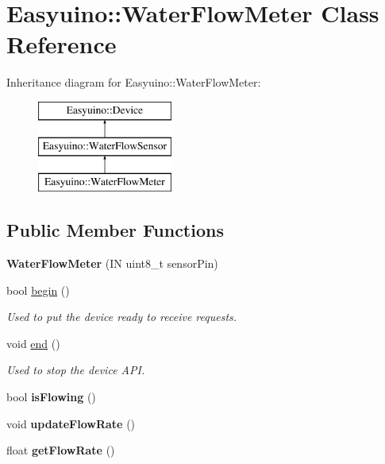 \hypertarget{class_easyuino_1_1_water_flow_meter}{}\section{Easyuino\+:\+:Water\+Flow\+Meter Class Reference}
\label{class_easyuino_1_1_water_flow_meter}
Inheritance diagram for Easyuino\+:\+:Water\+Flow\+Meter\+:\begin{figure}[H]
\begin{center}
\leavevmode
\includegraphics[height=3.000000cm]{class_easyuino_1_1_water_flow_meter}
\end{center}
\end{figure}
\subsection*{Public Member Functions}
\begin{DoxyCompactItemize}
\item 
\mbox{\label{class_easyuino_1_1_water_flow_meter_a253cbf06355c4e7dd79ef801d18c5119}} 
{\bfseries Water\+Flow\+Meter} (IN uint8\+\_\+t sensor\+Pin)
\item 
bool \hyperlink{class_easyuino_1_1_water_flow_meter_a400c25b10a7cde45c623805546d071cd}{begin} ()
\begin{DoxyCompactList}\small\item\em Used to put the device ready to receive requests. \end{DoxyCompactList}\item 
void \hyperlink{class_easyuino_1_1_water_flow_meter_a47024d4da9568e42743a875c08c33121}{end} ()
\begin{DoxyCompactList}\small\item\em Used to stop the device A\+PI. \end{DoxyCompactList}\item 
\mbox{\label{class_easyuino_1_1_water_flow_meter_a40e53d19dc4458bd149618053a52389f}} 
bool {\bfseries is\+Flowing} ()
\item 
\mbox{\label{class_easyuino_1_1_water_flow_meter_a1798974218a55932876fafd749b98726}} 
void {\bfseries update\+Flow\+Rate} ()
\item 
\mbox{\label{class_easyuino_1_1_water_flow_meter_a3f531a6a6f8bf9a27d43915004889085}} 
float {\bfseries get\+Flow\+Rate} ()
\end{DoxyCompactItemize}
